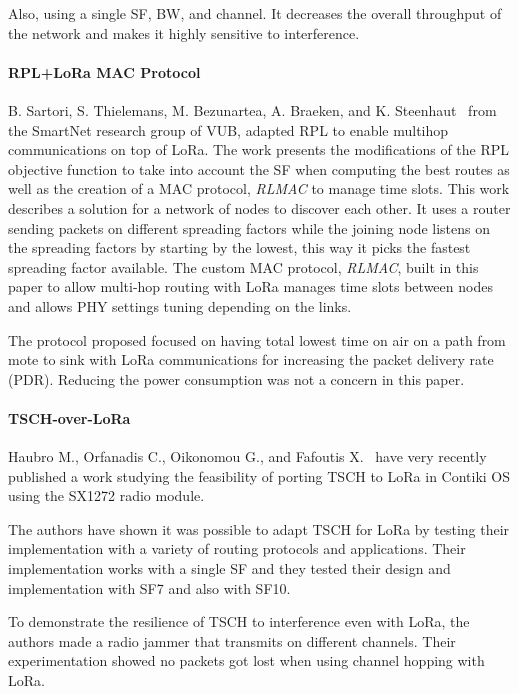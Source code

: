 Also, using a single SF, BW, and channel. It decreases the overall throughput
of the network and makes it highly sensitive to interference.

\paragraph{RPL+LoRa MAC Protocol}

B. Sartori, S. Thielemans, M. Bezunartea, A. Braeken, and K. Steenhaut~\cite{8115756}
from the SmartNet research group of VUB, adapted RPL
to enable multihop communications on top of LoRa.
The work presents the modifications of the RPL objective function to take into
account the SF when computing the best routes as well as the creation of a MAC
protocol, \emph{RLMAC} to manage time slots.
This work describes a solution for a network of nodes to discover each other.
It uses a router sending packets on different spreading factors while the joining
node listens on the spreading factors by starting by the lowest, this way it
picks the fastest spreading factor available.
The custom MAC protocol, \emph{RLMAC}, built in this paper to allow multi-hop
routing with LoRa manages time slots between nodes and allows PHY settings
tuning depending on the links.


The protocol proposed focused on having total lowest time on air on a path from
mote to sink with LoRa
communications for increasing the packet delivery rate (PDR).
Reducing the power consumption was not a concern in this paper.

\paragraph{TSCH-over-LoRa}

Haubro M., Orfanadis C., Oikonomou G., and Fafoutis X.~\cite{tschoverlora}
have very recently published a work studying the feasibility of porting TSCH to LoRa
in Contiki OS using the SX1272 radio module.

The authors have shown it was possible to adapt TSCH for LoRa by testing their
implementation with a variety of routing protocols and applications.
Their implementation works with a single SF and they tested their design and
implementation with SF7 and also with SF10.

To demonstrate the resilience of TSCH to interference even with LoRa, the
authors made a radio jammer that transmits on different channels. Their
experimentation showed no packets got lost when using channel hopping with
LoRa.

